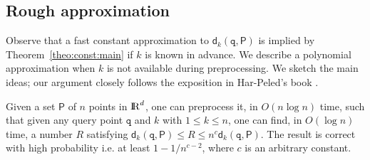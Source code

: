 \documentclass[12pt]{article}
\providecommand{\lemlab}[1]{\label{lemma:#1}}
\theoremstyle{remark}{\theorembodyfont{\rm} \newtheorem{remark}[theorem]{Remark}}
\newcommand{\thmref}[1]{Theorem~\ref{theo:#1}}
\newcommand{\pth}[2][\!]{#1\left({#2}\right)}
\newcommand{\distPk}[3]{\mathsf{d}_{#3}\pth{#2,#1}}
\newcommand{\order}[1]{O\pth{#1}}
\renewcommand{\Re}{{\rm I\!\hspace{-0.025em} R}}
\newcommand{\PntSet}{\mathsf{P}}
\newcommand{\query}{\mathtt{q}}
\newcommand{\approxkd}{R}
\begin{document}
\subsection{Rough approximation}


Observe that a fast constant approximation to
$\distPk{\PntSet}{\query}{k}$ is implied by \thmref{const:main} if $k$
is known in advance.  We describe a polynomial approximation when $k$
is not available during preprocessing.  We sketch the main ideas; our
argument closely follows the exposition in {Har-Peled}'s book
\cite{h-gaa-11}.

\begin{lemma}\lemlab{polyapprox}Given a set $\PntSet$ of $n$ points in $\Re^d$, one can preprocess
    it, in $\order{n \log n}$ time, such that given any query point
    $\query$ and $k$ with $1 \leq k \leq n$, one can find, in $O(\log n)$ time, 
    a number $\approxkd$
    satisfying $\distPk{\PntSet}{\query}{k} \leq \approxkd \leq n^{c}
    \distPk{\PntSet}{\query}{k}$. The result
    is correct with high probability i.e. at least $1 - 1/n^{c-2}$, 
    where $c$ is an arbitrary constant.
\end{lemma}
\end{document}
